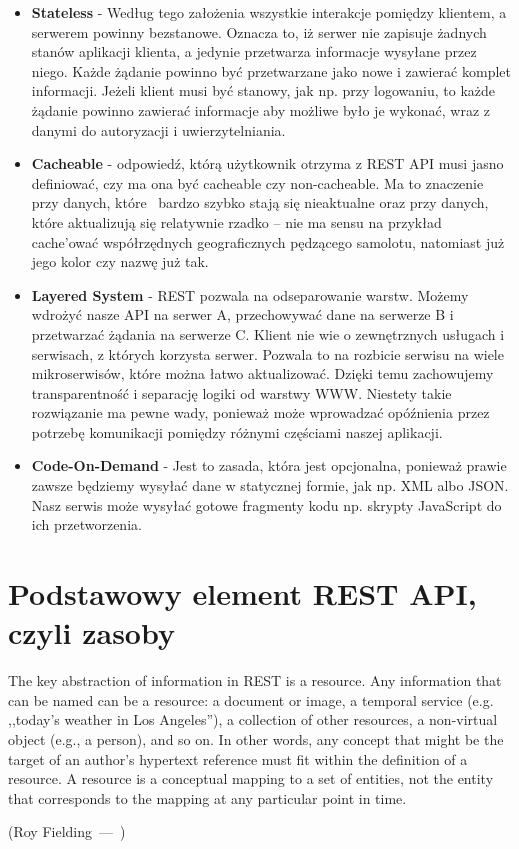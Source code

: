 \documentclass[oneside,polski,logo,indent]{amuthesis}
\let\oldquote\quote
\let\endoldquote\endquote
\renewenvironment{quote}[2][]
  {\if\relax\detokenize{#1}\relax
     \def\quoteauthor{#2}%
   \else
     \def\quoteauthor{#2~---~#1}%
   \fi
   \oldquote}
  {\par\nobreak\smallskip\hfill(\quoteauthor)%
   \endoldquote\addvspace{\bigskipamount}}
\begin{document}
\begin{itemize}
\item \textbf{Stateless} - Według tego założenia wszystkie interakcje pomiędzy klientem, a serwerem powinny bezstanowe. Oznacza to, iż serwer nie zapisuje żadnych stanów aplikacji klienta, a jedynie przetwarza informacje wysyłane przez niego. Każde żądanie powinno być przetwarzane jako nowe i zawierać komplet informacji. Jeżeli klient musi być stanowy, jak np. przy logowaniu, to każde żądanie powinno zawierać informacje aby możliwe było je wykonać, wraz z danymi do autoryzacji i uwierzytelniania.\newline 
\item \textbf{Cacheable} - odpowiedź, którą użytkownik otrzyma z REST API musi jasno definiować, czy ma ona być cacheable czy non-cacheable. Ma to znaczenie przy danych, które~ bardzo szybko stają się nieaktualne oraz przy danych, które aktualizują się relatywnie rzadko – nie ma sensu na przykład cache’ować współrzędnych geograficznych pędzącego samolotu, natomiast już jego kolor czy nazwę już tak.\newline
\item \textbf{Layered System} - REST pozwala na odseparowanie warstw. Możemy wdrożyć nasze API na serwer A, przechowywać dane na serwerze B i przetwarzać żądania na serwerze C. Klient nie wie o zewnętrznych usługach i serwisach, z których korzysta serwer. Pozwala to na rozbicie serwisu na wiele mikroserwisów, które można łatwo aktualizować. Dzięki temu zachowujemy transparentność i separację logiki od warstwy WWW. Niestety takie rozwiązanie ma pewne wady, ponieważ może wprowadzać opóźnienia przez potrzebę komunikacji pomiędzy różnymi częściami naszej aplikacji.\newline
\item \textbf{Code-On-Demand} - Jest to zasada, która jest opcjonalna, ponieważ prawie zawsze będziemy wysyłać dane w statycznej formie, jak np. XML albo JSON. Nasz serwis może wysyłać gotowe fragmenty kodu np. skrypty JavaScript do ich przetworzenia. 
\end{itemize}

\section{Podstawowy element REST API, czyli zasoby}

\begin{quote}{Roy Fielding}
The key abstraction of information in REST is a resource. Any information that can be named can be a resource: a document or image, a temporal service (e.g. ,,today’s weather in Los Angeles''), a collection of other resources, a non-virtual object (e.g., a person), and so on. In other words, any concept that might be the target of an author’s hypertext reference must fit within the definition of a resource. A resource is a conceptual mapping to a set of entities, not the entity that corresponds to the mapping at any particular point in time.
\end{quote}
\end{document}
